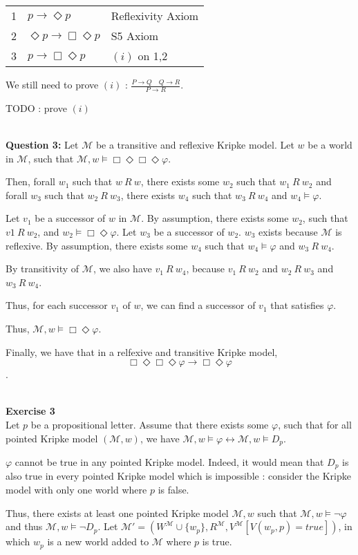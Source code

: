 \documentclass[10pt]{article}
\def\exercise#1{\ \vspace{1cm}\\\Large\textbf{Exercise #1}\normalsize\\}
\def\question#1{\ \vspace{1cm}\\\textbf{Question #1:}\quad}
\def\M{\mathcal{M}}
\begin{document}
\begin{tabular}{l l l}
1 & $p\rightarrow\Diamond p$ & Reflexivity Axiom\\
2 & $\Diamond p\rightarrow\Box\Diamond p$ & S5 Axiom\\
3 & $p\rightarrow\Box\Diamond p$ & $(i)$ on 1,2\\
\end{tabular}

We still need to prove $(i)$ : $\frac{P\rightarrow Q\quad Q\rightarrow R}{P\rightarrow R}$.

TODO : prove $(i)$

\question{3}
Let $\M$ be a transitive and reflexive Kripke model.
Let $w$ be a world in $\M$, such that $\M,w\models\Box\Diamond\Box\Diamond\varphi$.

Then, forall $w_1$ such that $w\ R\ w$, there exists some $w_2$ such that $w_1\ R\ w_2$ and forall $w_3$ such that $w_2\ R\ w_3$, there exists $w_4$ such that $w_3\ R\ w_4$ and $w_4\models\varphi$.

Let $v_1$ be a successor of $w$ in $\M$. By assumption, there exists some $w_2$, such that $v1\ R\ w_2$, and $w_2\models\Box\Diamond\varphi$. 
Let $w_3$ be a successor of $w_2$. $w_3$ exists because $\M$ is reflexive.
By assumption, there exists some $w_4$ such that $w_4\models\varphi$ and $w_3\ R\ w_4$.

By transitivity of $\M$, we also have $v_1\ R\ w_4$, because $v_1\ R\ w_2$ and $w_2\ R\ w_3$ and $w_3\ R\ w_4$.

Thus, for each successor $v_1$ of $w$, we can find a successor of $v_1$ that satisfies $\varphi$.

Thus, $\M,w\models\Box\Diamond\varphi$.

Finally, we have that in a relfexive and transitive Kripke model,
$$\Box\Diamond\Box\Diamond\varphi\rightarrow\Box\Diamond\varphi$$.

\exercise{3}
Let $p$ be a propositional letter.
Assume that there exists some $\varphi$, such that for all pointed Kripke model $(\M,w)$, we have $\M,w\models\varphi\leftrightarrow\M,w\models D_p$.

$\varphi$ cannot be true in any pointed Kripke model. Indeed, it would mean that $D_p$ is also true in every pointed Kripke model which is impossible : consider the Kripke model with only one world where $p$ is false.

Thus, there exists at least one pointed Kripke model $\M,w$ such that $\M,w\models\neg\varphi$ and thus $\M,w\models\neg D_p$.
Let $\M' = (W^\M\cup\{w_p\}, R^\M, V^\M[V(w_p,p)=\mathit{true}])$, in which $w_p$ is a new world added to $\M$ where $p$ is true.
\end{document}
